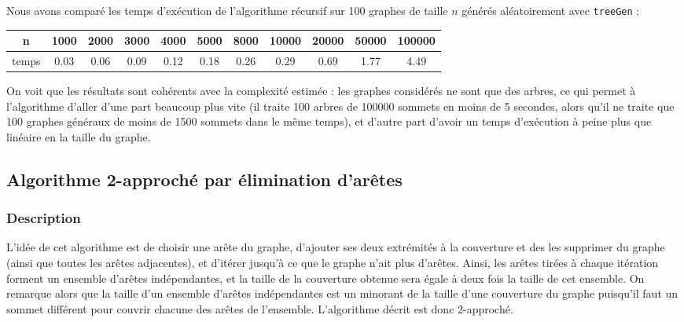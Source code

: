 \documentclass[a4paper,10pt]{article}
\begin{document}
Nous avons comparé les temps d'exécution de l'algorithme récursif sur 100 graphes de taille $n$ générés aléatoirement avec \texttt{treeGen} :
\begin{center}
\begin{tabular}{|c|c|c|c|c|c|c|c|c|c|c|}
	\hline 
	n & 1000 & 2000 & 3000 & 4000 & 5000 & 8000 & 10000 & 20000 & 50000 & 100000 \\
	\hline
	temps & 0.03 & 0.06 & 0.09 & 0.12 & 0.18 & 0.26 & 0.29 & 0.69 & 1.77 & 4.49\\
	\hline
\end{tabular}
\end{center}

On voit que les résultats sont cohérents avec la complexité estimée : les graphes considérés ne sont que des arbres, ce qui permet à l'algorithme d'aller d'une part beaucoup plus vite (il traite 100 arbres de 100000 sommets en moins de 5 secondes, alors qu'il ne traite que 100 graphes généraux de moins de 1500 sommets dans le même temps), et d'autre part d'avoir un temps d'exécution à peine plus que linéaire en la taille du graphe.


\subsection{Algorithme 2-approché par élimination d'arêtes}

\subsubsection{Description}

L'idée de cet algorithme est de choisir une arête du graphe, d'ajouter ses deux extrémités à la couverture et des les supprimer du graphe (ainsi que toutes les arêtes adjacentes), et d'itérer jusqu'à ce que le graphe n'ait plus d'arêtes. Ainsi, les arêtes tirées à chaque itération forment un ensemble d'arêtes indépendantes, et la taille de la couverture obtenue sera égale à deux fois la taille de cet ensemble. On remarque alors que la taille d'un ensemble d'arêtes indépendantes est un minorant de la taille d'une couverture du graphe puisqu'il faut un sommet différent pour couvrir chacune des arêtes de l'ensemble. L'algorithme décrit est donc 2-approché.
\end{document}
